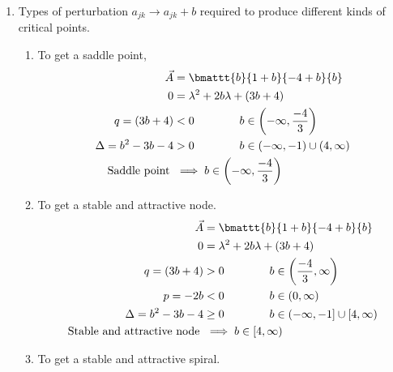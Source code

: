 \begin{enumerate}
    \item Types of perturbation $ a_{jk} \to a_{jk} + b $ required to
          produce different kinds of critical points.
          \begin{enumerate}
              \item To get a saddle point,
                    \begin{align}
                        \vec{A}               & = \bmattt{b}{1+b}{-4+b}{b}           \\
                        0                     & = \lambda^{2} + 2b\lambda + (3b + 4) \\
                        q = (3b+4)            & < 0 \qquad \qquad
                        b \in \left( -\infty, \frac{-4}{3} \right)                   \\
                        \Delta = b^2 - 3b - 4 & > 0 \qquad\qquad
                        b \in (-\infty,-1) \cup (4, \infty)                          \\
                        \text{Saddle point}\  & \implies b \in
                        \left( -\infty, \frac{-4}{3} \right)
                    \end{align}
              \item To get a stable and attractive node.
                    \begin{align}
                        \vec{A}                             & = \bmattt{b}{1+b}
                        {-4+b}{b}                                                 \\
                        0                                   &
                        = \lambda^{2} + 2b\lambda + (3b + 4)                      \\
                        q = (3b+4)                          & > 0 \qquad \qquad
                        b \in \left( \frac{-4}{3}, \infty \right)                 \\
                        p = -2b                             & < 0 \qquad\qquad
                        b \in (0, \infty)                                         \\
                        \Delta = b^2 - 3b - 4               & \geq 0 \qquad\qquad
                        b \in (-\infty,-1] \cup [4, \infty)                       \\
                        \text{Stable and attractive node}\  & \implies b \in
                        [4, \infty)
                    \end{align}
              \item To get a stable and attractive spiral.

\end{enumerate}
\end{enumerate}
